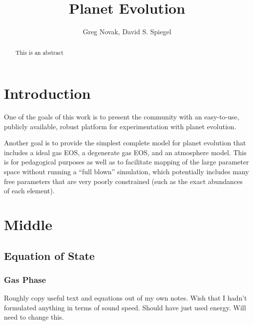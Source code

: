 \documentclass{emulateapj}
\begin{document}

\title{Planet Evolution}


\author{
%
Greg Novak,
%
David S. Spiegel
}




\vspace{0.5\baselineskip}



\begin{abstract}
This is an abstract
\end{abstract}



\section{Introduction}
\label{sec:intro}
One of the goals of this work is to present the community with an
easy-to-use, publicly available, robust platform for experimentation
with planet evolution.

Another goal is to provide the simplest complete model for planet
evolution that includes a ideal gas EOS, a degenerate gas EOS, and an
atmosphere model.  This is for pedagogical purposes as well as to
facilitate mapping of the large parameter space without running a
``full blown'' simulation, which potentially includes many free
parameters that are very poorly constrained (such as the exact
abundances of each element).  

\section{Middle}

\label{sec:mid}

\subsection{Equation of State}

\subsubsection{Gas Phase}
Roughly copy useful text and equations out of my own notes.  Wish that
I hadn't formulated anything in terms of sound speed.  Should have
just used energy.  Will need to change this.
\end{document}
